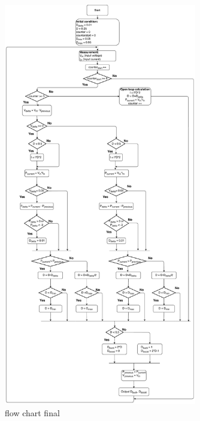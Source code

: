 \begin{figure}[H]
	\begin{center}
		\includegraphics[width=0.75\textwidth]{../Pictures/P1/Flow_chart/2018_11_15_Flow_chart_MPPT_Buck-Boost_converter}
		\caption{flow chart final }
		\label{fcfinal}
	\end{center}	
\end{figure}
